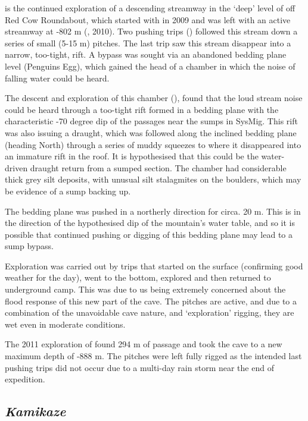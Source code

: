  is the continued exploration of a descending streamway
in the `deep' level of  off Red Cow Roundabout, which
started with  in 2009 and was left with an active
streamway at -802 m (, 2010). Two pushing trips
() followed this stream down a series of small (5-15
m) pitches. The last trip saw this stream disappear into a narrow,
too-tight, rift. A bypass was sought via an abandoned bedding plane
level (Penguins Egg), which gained the head of a chamber in which the
noise of falling water could be heard.

The descent and exploration of this chamber (), found that
the loud stream noise could be heard through a too-tight rift formed in
a bedding plane with the characteristic -70 degree dip of the passages
near the sumps in SysMig. This rift was also issuing a draught, which
was followed along the inclined bedding plane (heading North) through a
series of muddy squeezes to where it disappeared into an immature rift
in the roof. It is hypothesised that this could be the water-driven
draught return from a sumped section. The chamber had considerable thick
grey silt deposits, with unusual silt stalagmites on the boulders, which
may be evidence of a sump backing up.

The bedding plane was pushed in a northerly direction for circa. 20 m.
This is in the direction of the hypothesised dip of the mountain's water
table, and so it is possible that continued pushing or digging of this
bedding plane may lead to a sump bypass.

Exploration was carried out by trips that started on the surface
(confirming good weather for the day), went to the bottom, explored and
then returned to underground camp. This was due to us being extremely
concerned about the flood response of this new part of the cave. The
pitches are active, and due to a combination of the unavoidable cave
nature, and `exploration' rigging, they are wet even in moderate
conditions.

The 2011 exploration of  found 294 m of passage and took
the cave to a new maximum depth of -888 m. The pitches were left fully
rigged as the intended last pushing trips did not occur due to a
multi-day rain storm near the end of expedition.


\subsection{\texorpdfstring{\emph{Kamikaze}}{Kamikaze}}

